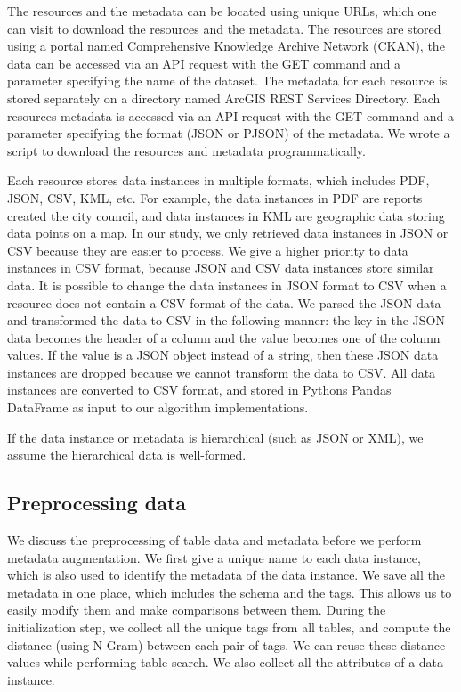 The resources and the metadata can be located using unique URLs, which one can visit to download the resources and the metadata. The resources are stored using a portal named Comprehensive Knowledge Archive Network (CKAN), the data can be accessed via an API request with the GET command and a parameter specifying the name of the dataset. The metadata for each resource is stored separately on a directory named ArcGIS REST Services Directory. Each resources metadata is accessed via an API request with the GET command and a parameter specifying the format (JSON or PJSON) of the metadata. We wrote a script to download the resources and metadata programmatically.

Each resource stores data instances in multiple formats, which includes PDF, JSON, CSV, KML, etc. For example, the data instances in PDF are reports created the city council, and data instances in KML are geographic data storing data points on a map. In our study, we only retrieved data instances in JSON or CSV because they are easier to process. We give a higher priority to data instances in CSV format, because JSON and CSV data instances store similar data. It is possible to change the data instances in JSON format to CSV when a resource does not contain a CSV format of the data. We parsed the JSON data and transformed the data to CSV in the following manner: the key in the JSON data becomes the header of a column and the value becomes one of the column values. If the value is a JSON object instead of a string, then these JSON data instances are dropped because we cannot transform the data to CSV. All data instances are converted to CSV format, and stored in Pythons Pandas DataFrame as input to our algorithm implementations.

If the data instance or metadata is hierarchical (such as JSON or XML), we assume the hierarchical data is well-formed.

\subsection{Preprocessing data}

We discuss the preprocessing of table data and metadata before we perform metadata augmentation. We first give a unique name to each data instance, which is also used to identify the metadata of the data instance. We save all the metadata in one place, which includes the schema and the tags. This allows us to easily modify them and make comparisons between them. During the initialization step, we collect all the unique tags from all tables, and compute the distance (using N-Gram) between each pair of tags. We can reuse these distance values while performing table search. We also collect all the attributes of a data instance.

